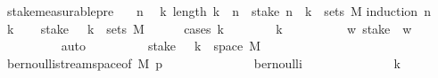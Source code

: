 \begin{isabellebody}
\isamarkupfalse%
%
\endisatagproof
{\isafoldproof}%
%
\isadelimproof
\isanewline
%
\endisadelimproof
\isanewline
\isanewline
\isanewline
{}\isamarkupfalse%
\ stake{\isacharunderscore}{\kern0pt}measurable{\isacharunderscore}{\kern0pt}pre{\isacharcolon}{\kern0pt}\isanewline
\ \ \ n\isanewline
\ \ k{\isachardot}{\kern0pt}\ length\ k\ {\isasymge}\ n\ {\isasymLongrightarrow}\ {\isacharparenleft}{\kern0pt}stake\ n\ {\isacharminus}{\kern0pt}{\isacharbackquote}{\kern0pt}\ {\isacharbraceleft}{\kern0pt}k{\isacharbraceright}{\kern0pt}{\isacharparenright}{\kern0pt}\ {\isasymin}\ sets\ M{\isachardoublequoteclose}\isanewline
%
\isadelimproof
%
\endisadelimproof
%
\isatagproof
{}\isamarkupfalse%
{\isacharparenleft}{\kern0pt}induction\ n{\isacharparenright}{\kern0pt}\isanewline
\ \ \isamarkupfalse%
\ k\isanewline
\ \ \isamarkupfalse%
\ {\isachardoublequoteopen}{\isacharparenleft}{\kern0pt}stake\ {}\ {\isacharminus}{\kern0pt}{\isacharbackquote}{\kern0pt}\ {\isacharbraceleft}{\kern0pt}k{\isacharbraceright}{\kern0pt}{\isacharparenright}{\kern0pt}\ {\isasymin}\ sets\ M{\isachardoublequoteclose}\isanewline
\ \ \ \ \isamarkupfalse%
\ {\isacharparenleft}{\kern0pt}cases\ k{\isacharparenright}{\kern0pt}\isanewline
\ \ \ \ \ \ \isamarkupfalse%
\ {\isachardoublequoteopen}k\ {\isacharequal}{\kern0pt}\ {\isacharbrackleft}{\kern0pt}{\isacharbrackright}{\kern0pt}{\isachardoublequoteclose}\isanewline
\ \ \ \ \ \ \isamarkupfalse%
\ {\isachardoublequoteopen}{\isasymforall}w{\isachardot}{\kern0pt}\ stake\ {}\ w\ {\isacharequal}{\kern0pt}\ {\isacharbrackleft}{\kern0pt}{\isacharbrackright}{\kern0pt}{\isachardoublequoteclose}\isanewline
\ \ \ \ \ \ \ \ \isamarkupfalse%
\ auto\isanewline
\ \ \ \ \ \ \isamarkupfalse%
\ \isamarkupfalse%
\ {\isachardoublequoteopen}{\isacharparenleft}{\kern0pt}stake\ {}\ {\isacharminus}{\kern0pt}{\isacharbackquote}{\kern0pt}\ {\isacharbraceleft}{\kern0pt}k{\isacharbraceright}{\kern0pt}{\isacharparenright}{\kern0pt}\ {\isacharequal}{\kern0pt}\ space\ M{\isachardoublequoteclose}\isanewline
\ \ \ \ \ \ \ \ \isamarkupfalse%
\ bernoulli{\isacharunderscore}{\kern0pt}stream{\isacharunderscore}{\kern0pt}space{\isacharbrackleft}{\kern0pt}of\ M\ p{\isacharbrackright}{\kern0pt}\isanewline
\ \ \ \ \ \ \ \ \ \ \ \ \ \ bernoulli\isanewline
\ \ \ \ \ \ \ \ \ \ \ \ \ \ {\isacartoucheopen}k\ {\isacharequal}{\kern0pt}\ {\isacharbrackleft}{\kern0pt}{\isacharbrackright}{\kern0pt}{\isacartoucheclose}\ \isanewline

\end{isabellebody}
